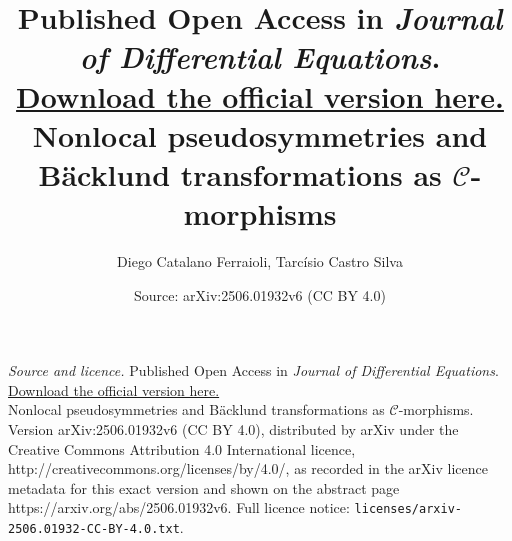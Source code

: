 \documentclass[10pt,a4paper]{amsart}
\title{\vspace{-2cm} {\footnotesize \textnormal{Published Open Access in \textit{Journal of Differential Equations}. \href{https://doi.org/10.1016/j.jde.2026.114334}{Download the official version here.}}} \\ [1ex] Nonlocal pseudosymmetries and Bäcklund transformations as $\mathcal{C}$-morphisms}
\author{Diego Catalano Ferraioli, Tarc\'isio Castro Silva}
\date{Source: arXiv:2506.01932v6 (CC BY 4.0)}
\begin{document}
\maketitle

\noindent\emph{Source and licence.} \vspace{-2cm} {\footnotesize \textnormal{Published Open Access in \textit{Journal of Differential Equations}. \href{https://doi.org/10.1016/j.jde.2026.114334}{Download the official version here.}}} \\ [1ex] Nonlocal pseudosymmetries and Bäcklund transformations as $\mathcal{C}$-morphisms. Version arXiv:2506.01932v6 (CC BY 4.0), distributed by arXiv under the Creative Commons Attribution 4.0 International licence, http://creativecommons.org/licenses/by/4.0/, as recorded in the arXiv licence metadata for this exact version and shown on the abstract page https://arxiv.org/abs/2506.01932v6. Full licence notice: \texttt{licenses/arxiv-2506.01932-CC-BY-4.0.txt}.\par\smallskip
\end{document}

